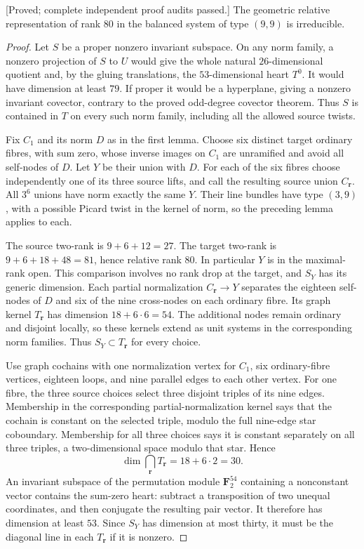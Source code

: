 \begin{lemma}
\label{lem:mixed-d3-common-partial-normalizations-candidate}
\textup{[Proved; complete independent proof audits passed.]}
The geometric relative representation of rank $80$ in the
balanced system of type $(9,9)$ is irreducible.
\end{lemma}
\begin{proof}
Let $S$ be a proper nonzero invariant subspace. On any norm
family, a nonzero projection of $S$ to $U$ would give the whole
natural $26$-dimensional quotient and, by the gluing translations,
the $53$-dimensional heart $T^0$. It would have dimension at
least $79$. If proper it would be a hyperplane, giving a
nonzero invariant covector, contrary to the proved odd-degree
covector theorem. Thus $S$ is contained in $T$ on every such
norm family, including all the allowed source twists.

Fix $C_1$ and its norm $D$ as in the first lemma. Choose six
distinct target ordinary fibres, with sum zero, whose inverse
images on $C_1$ are unramified and avoid all self-nodes of $D$.
Let $Y$ be their union with $D$. For each of the six fibres
choose independently one of its three source lifts, and call
the resulting source union $C_{\mathbf r}$. All $3^6$ unions
have norm exactly the same $Y$. Their line bundles have type
$(3,9)$, with a possible Picard twist in the kernel of norm,
so the preceding lemma applies to each.

The source two-rank is $9+6+12=27$. The target two-rank is
$9+6+18+48=81$, hence relative rank $80$. In particular $Y$
is in the maximal-rank open. This comparison involves no
rank drop at the target, and $S_Y$ has its generic dimension.
Each partial normalization $C_{\mathbf r}\to Y$ separates
the eighteen self-nodes of $D$ and six of the nine cross-nodes
on each ordinary fibre. Its graph kernel $T_{\mathbf r}$ has
dimension $18+6\cdot6=54$. The additional nodes remain
ordinary and disjoint locally, so these kernels extend as
unit systems in the corresponding norm families. Thus
$S_Y\subset T_{\mathbf r}$ for every choice.

Use graph cochains with one normalization vertex for $C_1$,
six ordinary-fibre vertices, eighteen loops, and nine parallel
edges to each other vertex. For one fibre, the three source
choices select three disjoint triples of its nine edges.
Membership in the corresponding partial-normalization kernel
says that the cochain is constant on the selected triple,
modulo the full nine-edge star coboundary. Membership for all
three choices says it is constant separately on all three
triples, a two-dimensional space modulo that star. Hence
\[
                \dim\bigcap_{\mathbf r}T_{\mathbf r}
                         =18+6\cdot2=30.
\]
An invariant subspace of the permutation module
$\mathbf F_2^{54}$ containing a nonconstant vector contains
the sum-zero heart: subtract a transposition of two unequal
coordinates, and then conjugate the resulting pair vector.
It therefore has dimension at least $53$. Since $S_Y$ has
dimension at most thirty, it must be the diagonal line in
each $T_{\mathbf r}$ if it is nonzero.


\end{proof}
